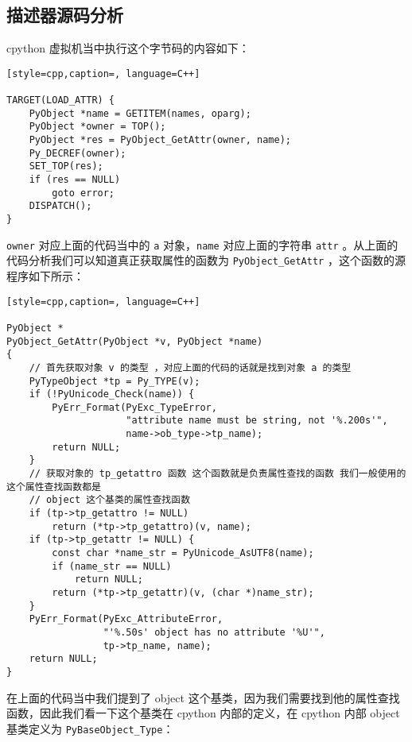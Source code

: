 \subsection{描述器源码分析}
cpython 虚拟机当中执行这个字节码的内容如下：
\begin{lstlisting}[style=cpp,caption=, language=C++]

TARGET(LOAD_ATTR) {
    PyObject *name = GETITEM(names, oparg);
    PyObject *owner = TOP();
    PyObject *res = PyObject_GetAttr(owner, name);
    Py_DECREF(owner);
    SET_TOP(res);
    if (res == NULL)
        goto error;
    DISPATCH();
}
\end{lstlisting}
\verb|owner| 对应上面的代码当中的 \verb|a| 对象，\verb|name| 对应上面的字符串 \verb|attr| 。从上面的代码分析我们可以知道真正获取属性的函数为 \verb|PyObject_GetAttr| ，这个函数的源程序如下所示：
\begin{lstlisting}[style=cpp,caption=, language=C++]

PyObject *
PyObject_GetAttr(PyObject *v, PyObject *name)
{
    // 首先获取对象 v 的类型 ，对应上面的代码的话就是找到对象 a 的类型
    PyTypeObject *tp = Py_TYPE(v);
    if (!PyUnicode_Check(name)) {
        PyErr_Format(PyExc_TypeError,
                     "attribute name must be string, not '%.200s'",
                     name->ob_type->tp_name);
        return NULL;
    }
    // 获取对象的 tp_getattro 函数 这个函数就是负责属性查找的函数 我们一般使用的这个属性查找函数都是
    // object 这个基类的属性查找函数
    if (tp->tp_getattro != NULL)
        return (*tp->tp_getattro)(v, name);
    if (tp->tp_getattr != NULL) {
        const char *name_str = PyUnicode_AsUTF8(name);
        if (name_str == NULL)
            return NULL;
        return (*tp->tp_getattr)(v, (char *)name_str);
    }
    PyErr_Format(PyExc_AttributeError,
                 "'%.50s' object has no attribute '%U'",
                 tp->tp_name, name);
    return NULL;
}
\end{lstlisting}
在上面的代码当中我们提到了 object 这个基类，因为我们需要找到他的属性查找函数，因此我们看一下这个基类在 cpython 内部的定义，在 cpython 内部 object 基类定义为 \verb|PyBaseObject_Type|：
